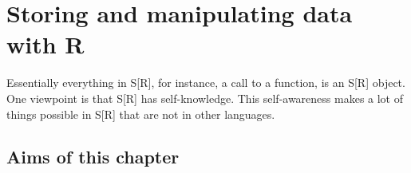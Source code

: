 \documentclass[krantz2]{krantz}\usepackage{knitr}%
\begin{document}

\frontmatter

\maketitle


\setcounter{page}{7} %
\tableofcontents
%

\listoffigures
\listoftables
%
%

\mainmatter

















\chapter{Storing and manipulating data with R}\label{chap:R:data}

\begin{VF}
Essentially everything in S[R], for instance, a call to a function, is an S[R] object. One viewpoint is that S[R] has self-knowledge. This self-awareness makes a lot of things possible in S[R] that are not in other languages.

\end{VF}


\section{Aims of this chapter}
\end{document}
